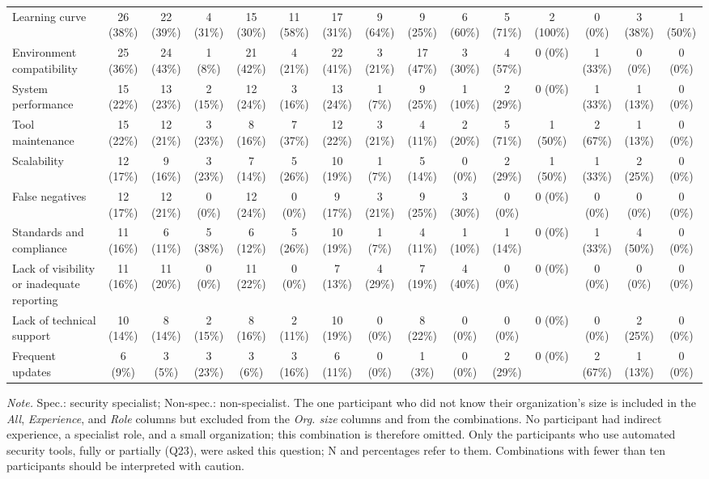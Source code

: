 \begin{table}[ht!]
{\begin{tabular}{@{}l c cc cc cccccc ccc@{}}
Learning curve & 26 (38\%) & 22 (39\%) & 4 (31\%) & 15 (30\%) & 11 (58\%) & 17 (31\%) & 9 (64\%) & 9 (25\%) & 6 (60\%) & 5 (71\%) & 2 (100\%) & 0 (0\%) & 3 (38\%) & 1 (50\%) \\
Environment compatibility & 25 (36\%) & 24 (43\%) & 1 (8\%) & 21 (42\%) & 4 (21\%) & 22 (41\%) & 3 (21\%) & 17 (47\%) & 3 (30\%) & 4 (57\%) & 0 (0\%) & 1 (33\%) & 0 (0\%) & 0 (0\%) \\
System performance & 15 (22\%) & 13 (23\%) & 2 (15\%) & 12 (24\%) & 3 (16\%) & 13 (24\%) & 1 (7\%) & 9 (25\%) & 1 (10\%) & 2 (29\%) & 0 (0\%) & 1 (33\%) & 1 (13\%) & 0 (0\%) \\
Tool maintenance & 15 (22\%) & 12 (21\%) & 3 (23\%) & 8 (16\%) & 7 (37\%) & 12 (22\%) & 3 (21\%) & 4 (11\%) & 2 (20\%) & 5 (71\%) & 1 (50\%) & 2 (67\%) & 1 (13\%) & 0 (0\%) \\
Scalability & 12 (17\%) & 9 (16\%) & 3 (23\%) & 7 (14\%) & 5 (26\%) & 10 (19\%) & 1 (7\%) & 5 (14\%) & 0 (0\%) & 2 (29\%) & 1 (50\%) & 1 (33\%) & 2 (25\%) & 0 (0\%) \\
False negatives & 12 (17\%) & 12 (21\%) & 0 (0\%) & 12 (24\%) & 0 (0\%) & 9 (17\%) & 3 (21\%) & 9 (25\%) & 3 (30\%) & 0 (0\%) & 0 (0\%) & 0 (0\%) & 0 (0\%) & 0 (0\%) \\
Standards and compliance & 11 (16\%) & 6 (11\%) & 5 (38\%) & 6 (12\%) & 5 (26\%) & 10 (19\%) & 1 (7\%) & 4 (11\%) & 1 (10\%) & 1 (14\%) & 0 (0\%) & 1 (33\%) & 4 (50\%) & 0 (0\%) \\
Lack of visibility or inadequate reporting & 11 (16\%) & 11 (20\%) & 0 (0\%) & 11 (22\%) & 0 (0\%) & 7 (13\%) & 4 (29\%) & 7 (19\%) & 4 (40\%) & 0 (0\%) & 0 (0\%) & 0 (0\%) & 0 (0\%) & 0 (0\%) \\
Lack of technical support & 10 (14\%) & 8 (14\%) & 2 (15\%) & 8 (16\%) & 2 (11\%) & 10 (19\%) & 0 (0\%) & 8 (22\%) & 0 (0\%) & 0 (0\%) & 0 (0\%) & 0 (0\%) & 2 (25\%) & 0 (0\%) \\
Frequent updates & 6 (9\%) & 3 (5\%) & 3 (23\%) & 3 (6\%) & 3 (16\%) & 6 (11\%) & 0 (0\%) & 1 (3\%) & 0 (0\%) & 2 (29\%) & 0 (0\%) & 2 (67\%) & 1 (13\%) & 0 (0\%) \\
\bottomrule
\end{tabular}%
}

\vspace{2pt}
\begin{minipage}{0.98\textwidth}
\footnotesize
\textit{Note.} Spec.: security specialist; Non-spec.: non-specialist. The one participant who did not know their organization's size is included in the \textit{All}, \textit{Experience}, and \textit{Role} columns but excluded from the \textit{Org. size} columns and from the combinations. No participant had indirect experience, a specialist role, and a small organization; this combination is therefore omitted. Only the participants who use automated security tools, fully or partially (Q23), were asked this question; N and percentages refer to them. Combinations with fewer than ten participants should be interpreted with caution.
\end{minipage}
\end{table}
